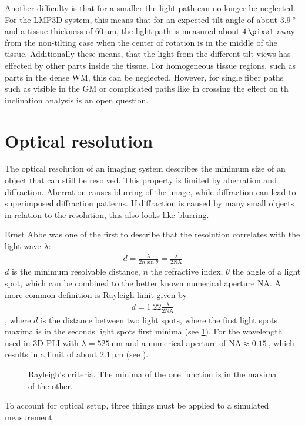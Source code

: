 \par
%
Another difficulty is that for a smaller \Pixelsize{} the light path can no longer be neglected.
For the \ac{LMP3D}-system, this means that for an expected tilt angle of about $\SI{3.9}{\degree}$ and a tissue thickness of $\SI{60}{\micro\meter}$, the light path is measured about $\SI{4}{\pixel}$ away from the non-tilting case when the center of rotation is in the middle of the tissue.
Additionally these means, that the light from the different tilt views has effected by other parts inside the tissue.
For homogeneous tissue regions, such as parts in the dense \ac{WM}, this can be neglected.
However, for single fiber paths such as visible in the \ac{GM} or complicated paths like in crossing the effect on th inclination analysis is an open question.
%
%
%
\section{Optical resolution}
\label{sec:opticalResolution}
%
The optical resolution of an imaging system describes the minimum size of an object that can still be resolved.
This property is limited by aberration and diffraction.
Aberration causes blurring of the image, while diffraction can lead to superimposed diffraction patterns.
If diffraction is caused by many small objects in relation to the resolution, this also looks like blurring.
\par
%
Ernst Abbe was one of the first to describe that the resolution correlates with the light wave $\lambda$:
\begin{align}
d=\frac{ \lambda}{2 n \sin \theta} = \frac{\lambda}{2\mathrm{NA}} 
\end{align}
$d$ is the minimum resolvable distance, $n$ the refractive index, $\theta$ the angle of a light spot, which can be combined to the better known numerical aperture $\mathrm{NA}$.
A more common definition is Rayleigh limit given by
\begin{align}
d=1.22\frac{\lambda}{2\mathrm{NA}} 
\end{align}
, where $d$ is the distance between two light spots, where the first light spots maxima is in the seconds light spots first minima (see \cref{fig:rayleigh}).
For the wavelength used in \ac{3D-PLI} with $\lambda = \SI{525}{\nano\meter}$ and a numerical aperture of $\mathrm{NA} \approx \SI{0.15}{}$, which results in a limit of about $\SI{2.1}{\micro\meter}$ (see \cite{MenzelDissertation}).
%
\begin{figure}[!t]
\setlength{\tikzwidth}{0.5\textwidth}
\centering
\caption[Raylay criterium]{Rayleigh's criteria. The minima of the one function is in the maxima of the other.}
\label{fig:rayleigh}
\end{figure}
%
To account for optical setup, three things must be applied to a simulated measurement.
%
